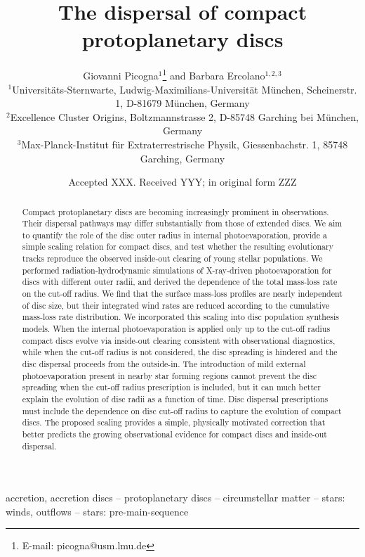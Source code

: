 \documentclass[fleqn,usenatbib]{mnras}
\title[The dispersal of compact protoplanetary discs]{The dispersal of compact protoplanetary discs}
\author[G. Picogna et al.]{
Giovanni Picogna$^{1}$\thanks{E-mail: picogna@usm.lmu.de}
and Barbara Ercolano$^{1,2,3}$
\\
$^{1}$Universit\"{a}ts-Sternwarte, Ludwig-Maximilians-Universit\"{a}t M\"{u}nchen, Scheinerstr. 1, D-81679 M\"{u}nchen, Germany\\
$^{2}$Excellence Cluster Origins, Boltzmannstrasse 2, D-85748 Garching bei M\"{u}nchen, Germany\\
$^{3}$Max-Planck-Institut f\"{u}r Extraterrestrische Physik, Giessenbachstr. 1, 85748 Garching, Germany
}
\date{Accepted XXX. Received YYY; in original form ZZZ}
\begin{document}
\pagerange{\pageref{firstpage}--\pageref{lastpage}}
\maketitle

\begin{abstract}
\label{firstpage}
Compact protoplanetary discs are becoming increasingly prominent in observations. Their dispersal pathways may differ substantially from those of extended discs. We aim to quantify the role of the disc outer radius in internal photoevaporation, provide a simple scaling relation for compact discs, and test whether the resulting evolutionary tracks reproduce the observed inside-out clearing of young stellar populations. We performed radiation-hydrodynamic simulations of X-ray-driven photoevaporation for discs with different outer radii, and derived the dependence of the total mass-loss rate on the cut-off radius. We find that the surface mass-loss profiles are nearly independent of disc size, but their integrated wind rates are reduced according to the cumulative mass-loss rate distribution. We incorporated this scaling into disc population synthesis models. When the internal photoevaporation is applied only up to the cut-off radius compact discs evolve via inside-out clearing consistent with observational diagnostics, while when the cut-off radius is not considered, the disc spreading is hindered and the disc dispersal proceeds from the outside-in. The introduction of mild external photoevaporation present in nearby star forming regions cannot prevent the disc spreading when the cut-off radius prescription is included, but it can much better explain the evolution of disc radii as a function of time. Disc dispersal prescriptions must include the dependence on disc cut-off radius to capture the evolution of compact discs. The proposed scaling provides a simple, physically motivated correction that better predicts the growing observational evidence for compact discs and inside-out dispersal.
\end{abstract}

\begin{keywords}
accretion, accretion discs -- protoplanetary discs -- circumstellar matter -- stars: winds, outflows -- stars: pre-main-sequence
\end{keywords}

\end{document}
